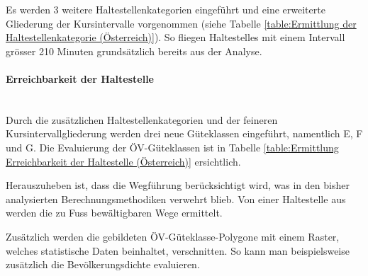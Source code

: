Es werden 3 weitere Haltestellenkategorien eingeführt und eine erweiterte Gliederung der Kursintervalle vorgenommen (siehe Tabelle \ref{table:Ermittlung der Haltestellenkategorie (Österreich)}).
So fliegen \glspl{Haltestelle} mit einem Intervall grösser 210 Minuten grundsätzlich bereits aus der Analyse.

\paragraph{Erreichbarkeit der Haltestelle}~\\
\label{Berechnungsmethodik Österreich:Erreichbarkeit der Haltestelle}
Durch die zusätzlichen Haltestellenkategorien und der feineren Kursintervallgliederung werden drei neue Güteklassen eingeführt, namentlich E, F und G.
Die Evaluierung der \gls{ÖV-Güteklassen} ist in Tabelle \ref{table:Ermittlung Erreichbarkeit der Haltestelle (Österreich)} ersichtlich.

Herauszuheben ist, dass die Wegführung berücksichtigt wird, was in den bisher analysierten Berechnungsmethodiken verwehrt blieb.
Von einer \gls{Haltestelle} aus werden die zu Fuss bewältigbaren Wege ermittelt.

Zusätzlich werden die gebildeten \acs{ÖV}-Güteklasse-Polygone mit einem Raster, welches statistische Daten beinhaltet, verschnitten.
So kann man beispielsweise zusätzlich die Bevölkerungsdichte evaluieren.

